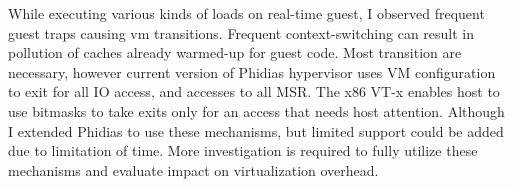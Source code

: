 While executing various kinds of loads on real-time guest, I observed frequent guest traps causing 
vm transitions. Frequent context-switching can result in pollution of caches already warmed-up for guest code.
Most transition are necessary, however current version of Phidias hypervisor uses VM configuration to
exit for all IO access, and accesses to all MSR.
The x86 VT-x enables host to use bitmasks to take exits only for an access that needs host attention.
Although I extended Phidias to use these mechanisms, but limited support could be added due to limitation of time.
More investigation is required to fully utilize these mechanisms and evaluate impact on virtualization overhead.

